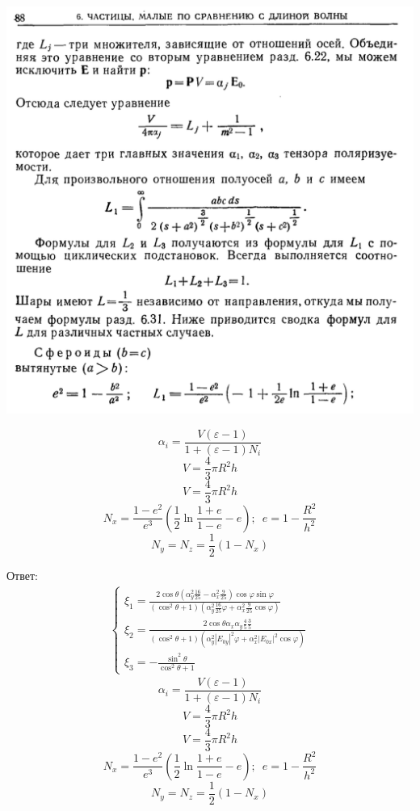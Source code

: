 \documentclass[12pt]{article}
\begin{document}
\begin{large}
\includegraphics[width=1\textwidth]{photo_2.png}
\par
\[
    \alpha_i = \frac{V \left( \varepsilon - 1 \right)}{1 + \left( \varepsilon - 1 \right) N_i}
\]
\[
    V = \frac{4}{3}\pi R^2 h
\]
\[
    V = \frac{4}{3}\pi R^2 h
\]
\[
    N_x = \frac{1-e^2}{e^3}\left( \frac{1}{2} \ln \frac{1+e}{1-e} - e \right) ; \, \, \, e = 1 - \frac{R^2}{h^2}
\]
\[
    N_y = N_z = \frac{1}{2} \left( 1 - N_x \right)
\]
\par Ответ:
\begin{eqnarray*}
    \begin{cases}
        \xi_1 = \frac{2 \cos \theta \left( \alpha_y^2 \frac{16}{25} - \alpha_x^2 \frac{9}{25} \right) \cos \varphi \sin \varphi}{\left( \cos^2 \theta + 1 \right)\left( \alpha_y^2 \frac{16}{25} \varphi + \alpha_x^2 \frac{9}{25} \cos \varphi \right)} \\
        \xi_2 = \frac{2 \cos \theta \alpha_x \alpha_y \frac{4}{5} \frac{3}{5}}{\left( \cos^2 \theta + 1 \right)\left( \alpha_y^2 |E_{0y}|^2 \varphi + \alpha_x^2 |E_{0x}|^2 \cos \varphi \right)} \\
        \xi_3 = - \frac{\sin^2 \theta}{\cos^2 \theta + 1}
    \end{cases}
\end{eqnarray*}
\[
    \alpha_i = \frac{V \left( \varepsilon - 1 \right)}{1 + \left( \varepsilon - 1 \right) N_i}
\]
\[
    V = \frac{4}{3}\pi R^2 h
\]
\[
    V = \frac{4}{3}\pi R^2 h
\]
\[
    N_x = \frac{1-e^2}{e^3}\left( \frac{1}{2} \ln \frac{1+e}{1-e} - e \right) ; \, \, \, e = 1 - \frac{R^2}{h^2}
\]
\[
    N_y = N_z = \frac{1}{2} \left( 1 - N_x \right)
\]
\par
\par
\end{large}
\end{document}
